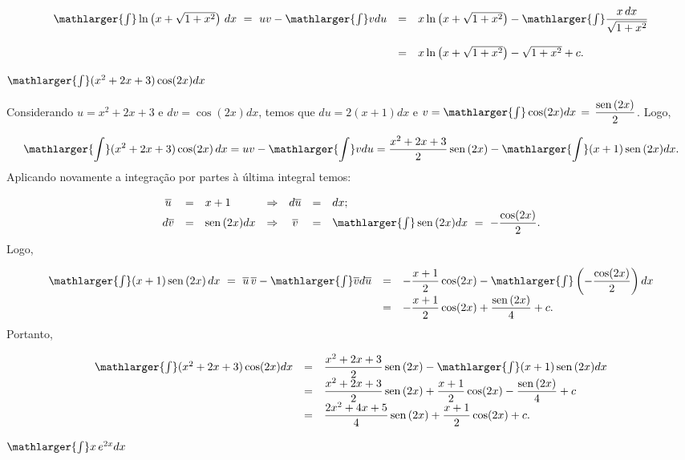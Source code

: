 \cleardoublepage\documentclass[../main.tex]{subfiles}
\begin{document}
\begin{exeresol}
\begin{compactenum}[a)]
\begin{solution}
\[ \begin{array}{rcl} \mathlarger{\int}\ln \left(x+\sqrt{1+x^2}\right) \,dx\,\, = \,\,uv-\mathlarger{\int} v du& =&x \ln \left(x+\sqrt{1+x^2}\right)- \mathlarger{\int} \dfrac{x\,dx}{\sqrt{1+x^2}}\\ \\ &=& x \ln \left(x+\sqrt{1+x^2}\right)-\sqrt{1+x^2} +c. \end{array} \]
  \end{solution}
  \item \(\mathlarger{\int} (x^2+2x+3)\cos( 2x)dx\)
  
  \begin{solution}
  Considerando \(u=x^2+2x+3\) e \(dv=\cos (2x)dx \), temos que \(du = 2(x+1)dx\) e \(v =\mathlarger{\int}\cos (2x)dx \, =\,\dfrac{\sen(2x)}{2} \). Logo,

\[ \mathlarger{\int} (x^2+2x+3)\cos (2x)\,dx = uv-\mathlarger{\int} v du= \dfrac{x^2+2x+3}{2} \sen(2x) - \mathlarger{\int} (x+1)\sen(2x)dx. \]
Aplicando novamente a integração por partes à última integral temos:

\[ \begin{array}{cclcccl} \overline{u} &=& x+1&\Rightarrow &d\overline{u} &=& dx;\\ d\overline{v} &=& \sen(2x)dx&\Rightarrow&\overline{v} &=& \mathlarger{\int}\sen(2x)dx \,\, =\,\,-\dfrac{\cos( 2x)}{2} . \end{array} \]
Logo,

\[ \begin{array}{rcl} \mathlarger{\int} (x+1)\sen(2x)\,dx \,\,= \,\, \overline{u} \,\overline{v}-\mathlarger{\int} \overline{v} d\overline{u} &=& -\dfrac{x+1}{2} \cos (2x) - \mathlarger{\int}\left( -\dfrac{\cos (2x)}{2}\right) dx\\ & =& -\dfrac{x+1}{2} \cos(2x) + \dfrac{\sen(2x)}{4}+c. \end{array} \]
Portanto,

\[ \begin{array}{rcl} \mathlarger{\int} (x^2+2x+3)\cos( 2x)dx &=& \dfrac{x^2+2x+3}{2} \sen(2x) - \mathlarger{\int} (x+1)\sen(2x)dx\\ &=& \dfrac{x^2+2x+3}{2} \sen(2x) + \dfrac{x+1}{2} \cos( 2x) - \dfrac{\sen(2x)}{4}+c \\ &=&\dfrac{2x^2+4x+5}{4} \sen(2x) + \dfrac{x+1}{2} \cos (2x) +c. \end{array} \]
  \end{solution}
  \item \(\mathlarger{\int}x\,e^{2x} dx\)
  

\end{compactenum}
\end{exeresol}
\end{document}
